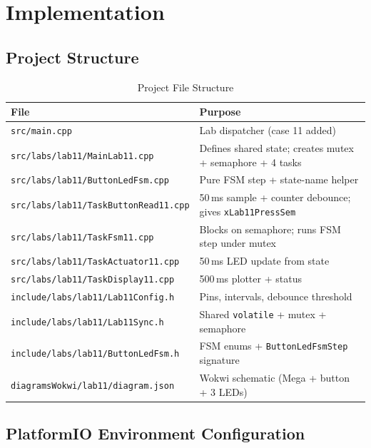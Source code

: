 \documentclass[12pt]{article}
\begin{document}
\section{Implementation}

\subsection{Project Structure}

\begin{table}[H]
\centering
\begin{tabular}{@{}lp{8.0cm}@{}}
\toprule
\textbf{File} & \textbf{Purpose} \\
\midrule
\texttt{src/main.cpp}                          & Lab dispatcher (case 11 added) \\
\texttt{src/labs/lab11/MainLab11.cpp}          & Defines shared state; creates mutex + semaphore + 4 tasks \\
\texttt{src/labs/lab11/ButtonLedFsm.cpp}       & Pure FSM step + state-name helper \\
\texttt{src/labs/lab11/TaskButtonRead11.cpp}   & 50\,ms sample + counter debounce; gives \texttt{xLab11PressSem} \\
\texttt{src/labs/lab11/TaskFsm11.cpp}          & Blocks on semaphore; runs FSM step under mutex \\
\texttt{src/labs/lab11/TaskActuator11.cpp}     & 50\,ms LED update from state \\
\texttt{src/labs/lab11/TaskDisplay11.cpp}      & 500\,ms plotter + status \\
\texttt{include/labs/lab11/Lab11Config.h}      & Pins, intervals, debounce threshold \\
\texttt{include/labs/lab11/Lab11Sync.h}        & Shared \texttt{volatile} + mutex + semaphore \\
\texttt{include/labs/lab11/ButtonLedFsm.h}     & FSM enums + \texttt{ButtonLedFsmStep} signature \\
\texttt{diagramsWokwi/lab11/diagram.json}      & Wokwi schematic (Mega + button + 3 LEDs) \\
\bottomrule
\end{tabular}
\caption{Project File Structure}
\label{tab:files}
\end{table}

\subsection{PlatformIO Environment Configuration}
\end{document}
